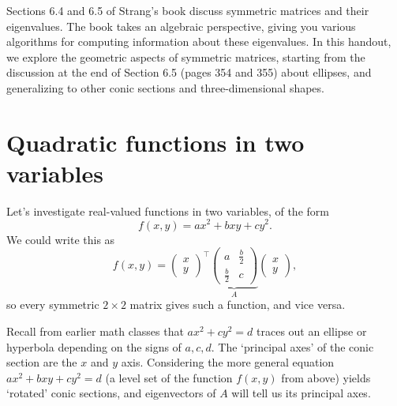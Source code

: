\documentclass[10pt]{amsart}
\theoremstyle{mythm}
\theoremstyle{definition}
\theoremstyle{myrmk}
\begin{document}
	\thispagestyle{fancy}
	
	\color{myblue}
	Sections 6.4 and 6.5 of Strang's book discuss symmetric matrices and their eigenvalues. The book takes an algebraic perspective, giving you various algorithms for computing information about these eigenvalues. In this handout, we explore the geometric aspects of symmetric matrices, starting from the discussion at the end of Section 6.5 (pages 354 and 355) about ellipses, and generalizing to other conic sections and three-dimensional shapes. 
	\color{black}
	
	\section{Quadratic functions in two variables} 
	
	Let's investigate real-valued functions in two variables, of the form
	\[
		f(x, y) = ax^2 + bxy + cy^2. 
	\]
	We could write this as 
	\[
		f(x, y) = \begin{pmatrix}
		x \\ y 
		\end{pmatrix}^\top \underbrace{\begin{pmatrix}
		a & \frac{b}{2} \\ \frac{b}{2} & c
		\end{pmatrix}}_{A}
		\begin{pmatrix}
		x \\ y 
		\end{pmatrix},
	\]
	so every symmetric $2 \times 2$ matrix gives such a function, and vice versa. 
	
	Recall from earlier math classes that $ax^2 + cy^2 = d$ traces out an ellipse or hyperbola depending on the signs of $a, c, d$. The `principal axes' of the conic section are the $x$ and $y$ axis. Considering the more general equation $ax^2 + bxy + cy^2 = d$ (a level set of the function $f(x, y)$ from above) yields `rotated' conic sections, and eigenvectors of $A$ will tell us its principal axes.
	
\end{document}
